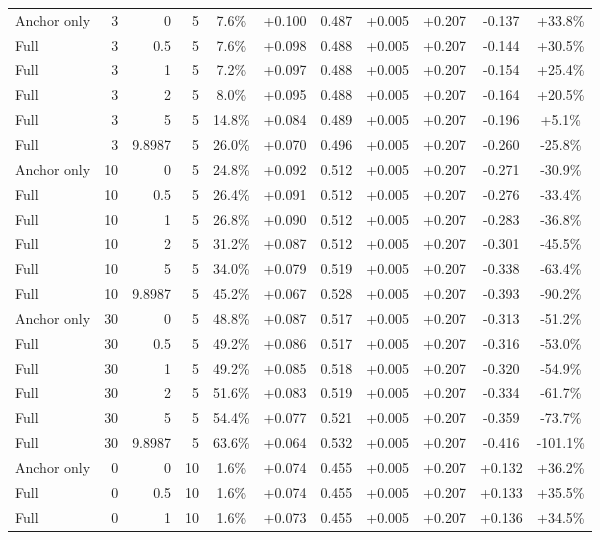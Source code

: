 \begin{table}[htbp]
\begin{tabular}{lrrrccccccc}
Anchor only & 3 & 0 & 5 & 7.6\% & +0.100 & 0.487 & +0.005 & +0.207 & -0.137 & +33.8\% \\
Full & 3 & 0.5 & 5 & 7.6\% & +0.098 & 0.488 & +0.005 & +0.207 & -0.144 & +30.5\% \\
Full & 3 & 1 & 5 & 7.2\% & +0.097 & 0.488 & +0.005 & +0.207 & -0.154 & +25.4\% \\
Full & 3 & 2 & 5 & 8.0\% & +0.095 & 0.488 & +0.005 & +0.207 & -0.164 & +20.5\% \\
Full & 3 & 5 & 5 & 14.8\% & +0.084 & 0.489 & +0.005 & +0.207 & -0.196 & +5.1\% \\
Full & 3 & 9.8987 & 5 & 26.0\% & +0.070 & 0.496 & +0.005 & +0.207 & -0.260 & -25.8\% \\
Anchor only & 10 & 0 & 5 & 24.8\% & +0.092 & 0.512 & +0.005 & +0.207 & -0.271 & -30.9\% \\
Full & 10 & 0.5 & 5 & 26.4\% & +0.091 & 0.512 & +0.005 & +0.207 & -0.276 & -33.4\% \\
Full & 10 & 1 & 5 & 26.8\% & +0.090 & 0.512 & +0.005 & +0.207 & -0.283 & -36.8\% \\
Full & 10 & 2 & 5 & 31.2\% & +0.087 & 0.512 & +0.005 & +0.207 & -0.301 & -45.5\% \\
Full & 10 & 5 & 5 & 34.0\% & +0.079 & 0.519 & +0.005 & +0.207 & -0.338 & -63.4\% \\
Full & 10 & 9.8987 & 5 & 45.2\% & +0.067 & 0.528 & +0.005 & +0.207 & -0.393 & -90.2\% \\
Anchor only & 30 & 0 & 5 & 48.8\% & +0.087 & 0.517 & +0.005 & +0.207 & -0.313 & -51.2\% \\
Full & 30 & 0.5 & 5 & 49.2\% & +0.086 & 0.517 & +0.005 & +0.207 & -0.316 & -53.0\% \\
Full & 30 & 1 & 5 & 49.2\% & +0.085 & 0.518 & +0.005 & +0.207 & -0.320 & -54.9\% \\
Full & 30 & 2 & 5 & 51.6\% & +0.083 & 0.519 & +0.005 & +0.207 & -0.334 & -61.7\% \\
Full & 30 & 5 & 5 & 54.4\% & +0.077 & 0.521 & +0.005 & +0.207 & -0.359 & -73.7\% \\
Full & 30 & 9.8987 & 5 & 63.6\% & +0.064 & 0.532 & +0.005 & +0.207 & -0.416 & -101.1\% \\
Anchor only & 0 & 0 & 10 & 1.6\% & +0.074 & 0.455 & +0.005 & +0.207 & +0.132 & +36.2\% \\
Full & 0 & 0.5 & 10 & 1.6\% & +0.074 & 0.455 & +0.005 & +0.207 & +0.133 & +35.5\% \\
Full & 0 & 1 & 10 & 1.6\% & +0.073 & 0.455 & +0.005 & +0.207 & +0.136 & +34.5\% \\

\end{tabular}
\end{table}

